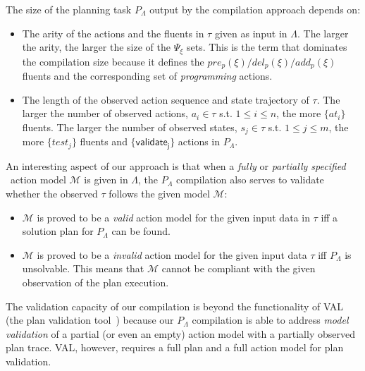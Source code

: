 The size of the planning task $P_{\Lambda}$ output by the compilation approach depends on:

\begin{itemize}
\item The arity of the actions and the fluents in $\tau$ given as input in $\Lambda$. The larger the arity, the larger the size of the $\Psi_{\xi}$ sets. This is the term that dominates the compilation size because it defines the $pre_p(\xi)/del_p(\xi)/add_p(\xi)$ fluents and the corresponding set of {\em programming} actions.
\item The length of the observed action sequence and state trajectory of $\tau$. The larger the number of observed actions, $a_i\in\tau$ s.t. $1\leq i\leq n$, the more $\{at_i\}$ fluents. The larger the number of observed states, $s_j\in\tau$ s.t. $1\leq j\leq m$, the more $\{test_j\}$ fluents and $\{\mathsf{validate_{j}}\}$ actions in $P_{\Lambda}$.
\end{itemize}

An interesting aspect of our approach is that when a {\em fully} or {\em partially specified} \strips\ action model $\mathcal{M}$ is given in $\Lambda$, the $P_{\Lambda}$ compilation also serves to validate whether the observed $\tau$ follows the given model $\mathcal{M}$:

\begin{itemize}
	\item $\mathcal{M}$ is proved to be a {\em valid} action model for the given input data in $\tau$ iff a solution plan for $P_{\Lambda}$ can be found.
	\item $\mathcal{M}$ is proved to be a {\em invalid} action model for the given input data $\tau$ iff $P_{\Lambda}$ is unsolvable. This means that $\mathcal{M}$ cannot be compliant with the given observation of the plan execution.
\end{itemize}


The validation capacity of our compilation is beyond the functionality of VAL (the plan validation tool~\cite{howey2004val}) because our $P_{\Lambda}$ compilation is able to address {\em model validation} of a partial (or even an empty) action model with a partially observed plan trace. VAL, however, requires a full plan and a full action model for plan validation.


